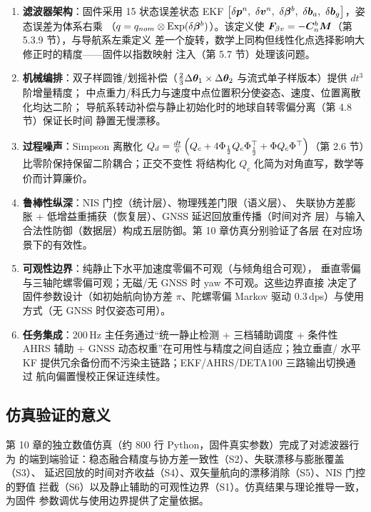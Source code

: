 \begin{enumerate}
  \item \textbf{滤波器架构}：固件采用 15 状态误差状态 EKF
    $\left[\delta\vp{p}^n,\ \delta\vp{v}^n,\ \delta\vp{\beta}^b,\
    \delta\vp{b}_a,\ \delta\vp{b}_g\right]$，姿态误差为体系右乘
    （$q = q_{nom}\otimes\operatorname{Exp}(\delta\boldsymbol{\beta}^b)$）。该定义使
    $\boldsymbol{F}_{\beta v} = -\boldsymbol{C}_n^b\boldsymbol{M}$（第 5.3.9 节），与导航系左乘定义
    差一个旋转，数学上同构但线性化点选择影响大修正时的精度——固件以指数映射
    注入（第 5.7 节）处理该问题。

  \item \textbf{机械编排}：双子样圆锥/划摇补偿（$\frac23\Delta\boldsymbol{\theta}_1
    \times\Delta\boldsymbol{\theta}_2$ 与流式单子样版本）提供 $dt^3$ 阶增量精度；
    中点重力/科氏力与速度中点位置积分使姿态、速度、位置离散化均达二阶；
    导航系转动补偿与静止初始化时的地球自转零偏分离（第 4.8 节）保证长时间
    静置无慢漂移。

  \item \textbf{过程噪声}：Simpson 离散化
    $Q_d = \frac{dt}{6}\left(Q_c + 4\Phi_{\frac12}Q_c\Phi_{\frac12}^{\top} +
    \Phi Q_c\Phi^{\top}\right)$（第 2.6 节）比零阶保持保留二阶耦合；正交不变性
    将结构化 $Q_c$ 化简为对角直写，数学等价而计算廉价。

  \item \textbf{鲁棒性纵深}：NIS 门控（统计层）、物理残差门限（语义层）、
    失联协方差膨胀 + 低增益重捕获（恢复层）、GNSS 延迟回放重传播（时间对齐
    层）与输入合法性防御（数据层）构成五层防御。第 10 章仿真分别验证了各层
    在对应场景下的有效性。

  \item \textbf{可观性边界}：纯静止下水平加速度零偏不可观（与倾角组合可观），
    垂直零偏与三轴陀螺零偏可观；无磁/无 GNSS 时 yaw 不可观。这些边界直接
    决定了固件参数设计（如初始航向协方差 $\pi$、陀螺零偏 Markov 驱动
    0.3\,dps）与使用方式（无 GNSS 时仅姿态可用）。

  \item \textbf{任务集成}：200\,Hz 主任务通过``统一静止检测 + 三档辅助调度 +
    条件性 AHRS 辅助 + GNSS 动态权重''在可用性与精度之间自适应；独立垂直/
    水平 KF 提供冗余备份而不污染主链路；EKF/AHRS/DETA100 三路输出切换通过
    航向偏置慢校正保证连续性。
\end{enumerate}

\subsection{仿真验证的意义}

第 10 章的独立数值仿真（约 800 行 Python，固件真实参数）完成了对滤波器行为
的端到端验证：稳态融合精度与协方差一致性（S2）、失联漂移与膨胀覆盖（S3）、
延迟回放的时间对齐收益（S4）、双矢量航向的漂移消除（S5）、NIS 门控的野值
拦截（S6）以及静止辅助的可观性边界（S1）。仿真结果与理论推导一致，为固件
参数调优与使用边界提供了定量依据。

